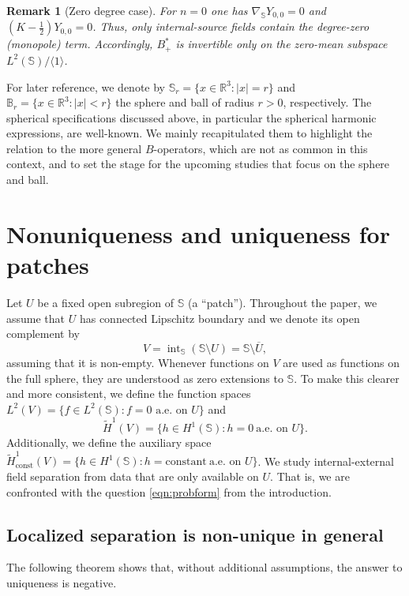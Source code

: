 \documentclass[a4paper, 11pt]{article}
\newtheorem{remark}[theorem]{Remark}
\renewcommand{\SS}{\mathbb{S}}
\newcommand{\BB}{\mathbb{B}}
\newcommand{\R}{\mathbb{R}}
\begin{document}
\begin{remark}[Zero degree case]
For $n=0$ one has $\nabla_\SS Y_{0,0}=0$ and $(K-\tfrac12)Y_{0,0}=0$. Thus, only {internal}-source fields contain the degree-zero (monopole) term. Accordingly, $B_+^{\ast}$ is invertible only on the zero-mean subspace $L^2(\SS)/\langle 1\rangle$.
\end{remark}

For later reference, we denote by $\SS_r=\{x\in\R^3:|x|=r\}$ and $\BB_r=\{x\in\R^3:|x|<r\}$ the sphere and ball of radius $r>0$, respectively. The spherical specifications discussed above, in particular the spherical harmonic expressions, are well-known. We mainly recapitulated them to highlight the relation to the more general $B$-operators, which are not as common in this context, and to set the stage for the upcoming studies that focus on the sphere and ball.


\section{Nonuniqueness and uniqueness for patches}\label{sec:localized}

Let $U$ be a fixed open subregion of $\SS$ (a ``patch''). Throughout the paper, we assume that $U$ has connected Lipschitz boundary and we denote its open complement by
\[
	V=\operatorname{int}_{\SS}(\SS\setminus U)=\SS\setminus \overline{U},
\]
assuming that it is non-empty. Whenever functions on $V$ are used as functions on the full sphere, they are understood as zero extensions to $\SS$. To make this clearer and more consistent, we define the function spaces $L^2(V)=\{f\in L^2(\SS):f=0\text{ a.e. on }U\}$ and
\[
	\widetilde H^1(V)=\{h\in H^1(\SS): h=0\ \text{a.e. on }U\}.
\]
Additionally, we define the auxiliary space $\widetilde H^1_{\text{const}}(V)=\{h\in H^1(\SS): h=\text{constant}\ \text{a.e. on }U\}$. We study internal-external field separation from data that are only available on $U$. That is, we are confronted with the question \eqref{eqn:probform} from the introduction. 





\subsection{Localized separation is non-unique in \texorpdfstring{general}{general}}\label{subsec:localized-impossible}

The following theorem shows that, without additional assumptions, the answer to uniqueness is negative.
\end{document}
